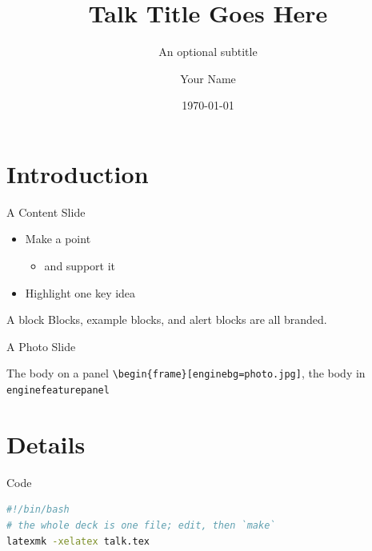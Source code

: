 \documentclass[aspectratio=169]{beamer}
\title{Talk Title Goes Here}
\subtitle{An optional subtitle}
\author{Your Name}
\institute{Your Title, Your Lab, Your Institution}
\date{\today}
\begin{document}
\begin{frame}
  \titlepage
\end{frame}

\section{Introduction}

\begin{frame}{A Content Slide}
  \begin{itemize}
  \item Make a point
    \begin{itemize}
    \item and support it
    \end{itemize}
  \item Highlight \alert{one key idea}
  \end{itemize}
  \begin{block}{A block}
    Blocks, example blocks, and alert blocks are all branded.
  \end{block}
\end{frame}

\begin{frame}[enginebg=images/wallpaper/mesa_lab.jpg]{A Photo Slide}
  \begin{enginefeaturepanel}
    \begin{block}{The body on a panel}
      \texttt{\textbackslash begin\{frame\}[enginebg=photo.jpg]}, the body in \texttt{enginefeaturepanel}
    \end{block}
  \end{enginefeaturepanel}
\end{frame}

\section{Details}

\begin{frame}[fragile]{Code}
\begin{lstlisting}[language=bash]
#!/bin/bash
# the whole deck is one file; edit, then `make`
latexmk -xelatex talk.tex
\end{lstlisting}
\end{frame}

\end{document}
